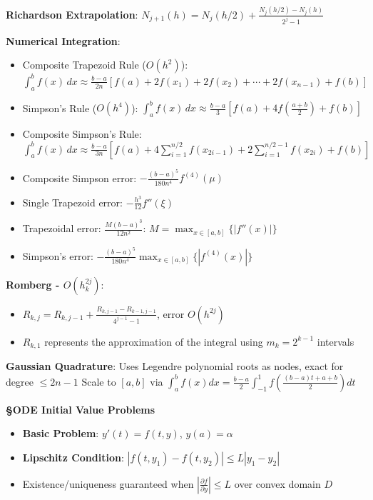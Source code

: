\documentclass{article}
\begin{document}
\begin{minipage}[t]{0.49\textwidth}
\textbf{Richardson Extrapolation}: $N_{j+1}(h) = N_j(h/2) + \frac{N_j(h/2) - N_j(h)}{2^{j}-1}$

\textbf{Numerical Integration}:
\begin{itemize}\setlength{\itemsep}{-1pt}
\item Composite Trapezoid Rule ($O(h^2)$): \\$\int_a^b f(x)\,dx \approx \frac{b-a}{2n}[f(a) +2f(x_1) + 2f(x_2)+\cdots+2f(x_{n-1}) + f(b)]$
\item Simpson's Rule ($O(h^4)$): $\int_a^b f(x)\,dx \approx \frac{b-a}{3}\left[f(a) + 4f\left(\frac{a+b}{2}\right) + f(b)\right]$
\item Composite Simpson's Rule:\\ $\int_a^b f(x)\,dx \approx \frac{b-a}{3n}\left[f(a) + 4\sum_{i=1}^{n/2}f(x_{2i-1}) + 2\sum_{i=1}^{n/2-1}f(x_{2i}) + f(b)\right]$
\item Composite Simpson error: $-\frac{(b-a)^5}{180n^4}f^{(4)}(\mu)$
\item Single Trapezoid error: $-\frac{h^3}{12}f''(\xi)$  
\item Trapezoidal error: $\frac{M(b-a)^3}{12n^2}$: $M=\max_{x\in[a,b]}\{|f''(x)|\}$
\item Simpson's error: $-\frac{(b-a)^5}{180n^4}\max_{x\in[a,b]}\{|f^{(4)}(x)|\}$
\end{itemize}

\textbf{Romberg - $O(h_k^{2j})$}: \\
\begin{itemize}
    \item{$R_{k,j} = R_{k,j-1} + \frac{R_{k,j-1} - R_{k-1,j-1}}{4^{j-1}-1}$, error $O(h^{2j})$}
    \item{$R_{k,1}$ represents the approximation of the integral using $m_k=2^{k-1}$ intervals}
\end{itemize}

\textbf{Gaussian Quadrature}: Uses Legendre polynomial roots as nodes, exact for degree $\leq 2n-1$
Scale to $[a,b]$ via $\int_a^b f(x)dx = \frac{b-a}{2}\int_{-1}^1 f\left(\frac{(b-a)t + a + b}{2}\right)dt$

\textbf{\S ODE Initial Value Problems}
\begin{itemize}
\item \textbf{Basic Problem}: $y'(t) = f(t,y)$, $y(a) = \alpha$
\item \textbf{Lipschitz Condition}: $|f(t,y_1) - f(t,y_2)| \leq L|y_1 - y_2|$ 
\item Existence/uniqueness guaranteed when $|\frac{\partial f}{\partial y}| \leq L$ over convex domain $D$
\end{itemize}


\end{minipage}
\end{document}
